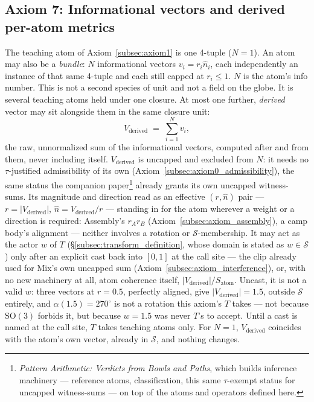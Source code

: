 \documentclass[12pt, a4paper]{article}
\begin{document}
\subsection{Axiom 7: Informational vectors and derived per-atom metrics}
\label{subsec:axiom_v1_metrics}
The teaching atom of Axiom~\ref{subsec:axiom1} is one 4-tuple
($N=1$). An atom may also be a \emph{bundle}: $N$ informational
vectors $v_i=r_i\hat n_i$, each independently an instance of that
same 4-tuple and each still capped at $r_i\le 1$. $N$ is the atom's
info number. This is not a second species of unit and not a field
on the globe. It is several teaching atoms held under one closure. At most one
further, \emph{derived} vector may sit alongside them in the same
closure unit:
\[
V_{\text{derived}} \;=\; \sum_{i=1}^{N} v_i,
\]
the raw, unnormalized sum of the informational vectors, computed
after and from them, never including itself. $V_{\text{derived}}$ is
uncapped and excluded from $N$: it needs no $\tau$-justified
admissibility of its own (Axiom~\ref{subsec:axiom0_admissibility}),
the same status the companion paper\footnote{\emph{Pattern
Arithmetic: Verdicts from Bowls and Paths}, which builds inference
machinery --- reference atoms, classification, this same
$\tau$-exempt status for uncapped witness-sums --- on top of the
atoms and operators defined here.} already grants its own uncapped
witness-sums. Its magnitude and direction read as an effective
$(r,\hat n)$ pair --- $r=\lvert V_{\text{derived}}\rvert$, $\hat n =
V_{\text{derived}}/r$ --- standing in for the atom wherever a weight
or a direction is required: Assembly's $r_Ar_B$
(Axiom~\ref{subsec:axiom_assembly}), a camp body's alignment ---
neither involves a rotation or $\mathcal{S}$-membership. It may act
as the actor $w$ of $T$ (\S\ref{subsec:transform_definition}, whose
domain is stated as $w\in\mathcal{S}$) only after an explicit cast
back into $[0,1]$ at the call site --- the clip already used for
Mix's own uncapped sum (Axiom~\ref{subsec:axiom_interference}), or,
with no new machinery at all, atom coherence itself, $\lvert
V_{\text{derived}}\rvert/S_{\text{atom}}$. Uncast, it is not a valid
$w$: three vectors at $r=0.5$, perfectly aligned, give $\lvert
V_{\text{derived}}\rvert=1.5$, outside $\mathcal{S}$ entirely, and
$\alpha(1.5)=270^\circ$ is not a rotation this axiom's $T$ takes ---
not because $\mathrm{SO}(3)$ forbids it, but because $w=1.5$ was
never $T$'s to accept. Until a cast is named at the call site, $T$
takes teaching atoms only. For $N=1$, $V_{\text{derived}}$ coincides
with the atom's own vector, already in $\mathcal{S}$, and nothing
changes.
\end{document}
